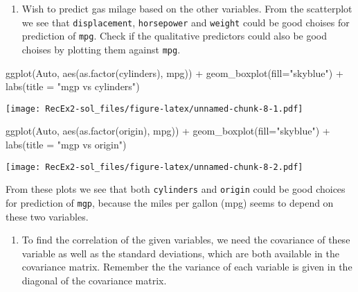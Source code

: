 \documentclass[
]{article}
\newenvironment{Shaded}{\begin{snugshade}}{\end{snugshade}}
\newcommand{\AttributeTok}[1]{\textcolor[rgb]{0.77,0.63,0.00}{#1}}
\newcommand{\FunctionTok}[1]{\textcolor[rgb]{0.00,0.00,0.00}{#1}}
\newcommand{\NormalTok}[1]{#1}
\newcommand{\SpecialCharTok}[1]{\textcolor[rgb]{0.00,0.00,0.00}{#1}}
\newcommand{\StringTok}[1]{\textcolor[rgb]{0.31,0.60,0.02}{#1}}
\providecommand{\tightlist}{%
  \setlength{\itemsep}{0pt}\setlength{\parskip}{0pt}}
\begin{document}
\begin{enumerate}
\def\labelenumi{\alph{enumi})}
\setcounter{enumi}{5}
\tightlist
\item
  Wish to predict gas milage based on the other variables. From the
  scatterplot we see that \texttt{displacement}, \texttt{horsepower} and
  \texttt{weight} could be good choises for prediction of \texttt{mpg}.
  Check if the qualitative predictors could also be good choises by
  plotting them against \texttt{mpg}.
\end{enumerate}

\begin{Shaded}
\begin{Highlighting}[]
\FunctionTok{ggplot}\NormalTok{(Auto, }\FunctionTok{aes}\NormalTok{(}\FunctionTok{as.factor}\NormalTok{(cylinders), mpg)) }\SpecialCharTok{+} 
  \FunctionTok{geom\_boxplot}\NormalTok{(}\AttributeTok{fill=}\StringTok{"skyblue"}\NormalTok{) }\SpecialCharTok{+} 
  \FunctionTok{labs}\NormalTok{(}\AttributeTok{title =} \StringTok{"mgp vs cylinders"}\NormalTok{) }
\end{Highlighting}
\end{Shaded}

\texttt{[image: RecEx2-sol\_files/figure-latex/unnamed-chunk-8-1.pdf]}

\begin{Shaded}
\begin{Highlighting}[]
\FunctionTok{ggplot}\NormalTok{(Auto, }\FunctionTok{aes}\NormalTok{(}\FunctionTok{as.factor}\NormalTok{(origin), mpg)) }\SpecialCharTok{+} 
  \FunctionTok{geom\_boxplot}\NormalTok{(}\AttributeTok{fill=}\StringTok{"skyblue"}\NormalTok{) }\SpecialCharTok{+} 
  \FunctionTok{labs}\NormalTok{(}\AttributeTok{title =} \StringTok{"mgp vs origin"}\NormalTok{) }
\end{Highlighting}
\end{Shaded}

\texttt{[image: RecEx2-sol\_files/figure-latex/unnamed-chunk-8-2.pdf]}

From these plots we see that both \texttt{cylinders} and \texttt{origin}
could be good choices for prediction of \texttt{mgp}, because the miles
per gallon (mpg) seems to depend on these two variables.

\begin{enumerate}
\def\labelenumi{\alph{enumi})}
\setcounter{enumi}{6}
\tightlist
\item
  To find the correlation of the given variables, we need the covariance
  of these variable as well as the standard deviations, which are both
  available in the covariance matrix. Remember the the variance of each
  variable is given in the diagonal of the covariance matrix.
\end{enumerate}
\end{document}
